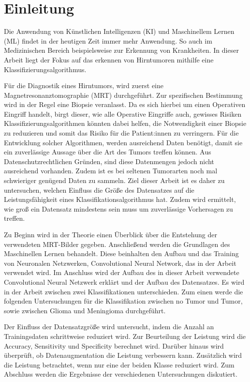 \chapter{Einleitung}

Die Anwendung von Künstlichen Intelligenzen (KI) und Maschinellem Lernen (ML) findet in der heutigen Zeit immer mehr Anwendung.
So auch im Medizinischen Bereich beispielsweise zur Erkennung von Krankheiten.
In dieser Arbeit liegt der Fokus auf das erkennen von Hirntumoren mithilfe eine Klassifizierungsalgorithmus.

Für die Diagnostik eines Hirntumors, wird zuerst eine Magnetresonanztomographie (MRT) durchgeführt.
Zur spezifischen Bestimmung wird in der Regel eine Biopsie veranlasst.
Da es sich hierbei um einen Operativen Eingriff handelt, birgt dieser, wie alle Operative Eingriffe auch, gewisses Risiken
Klassifizierungsalgorithmen könnten dabei helfen, die Notwendigkeit einer Biopsie zu reduzieren und somit das Risiko für die Patient:innen zu verringern.
Für die Entwicklung solcher Algorithmen, werden ausreichend Daten benötigt, damit sie ein zuverlässige Aussage über die Art des Tumors treffen können. 
Aus Datenschutzrechtlichen Gründen, sind diese Datenmengen jedoch nicht ausreichend vorhanden. 
Zudem ist es bei seltenen Tumorarten noch mal schwieriger genügend Daten zu sammeln.
Ziel dieser Arbeit ist es daher zu untersuchen, welchen Einfluss die Größe des Datensatzes auf die Leistungsfähigkeit eines Klassifikationsalgorithmus hat. 
Zudem wird ermittelt, wie groß ein Datensatz mindestens sein muss um zuverlässige Vorhersagen zu treffen.

Zu Beginn wird in der Theorie einen Überblick über die Entstehung der verwendeten MRT-Bilder gegeben. 
Anschließend werden die Grundlagen des Maschinellen Lernen behandelt.
Diese beinhalten den Aufbau und das Training von Neuronalen Netzwerken, Convolutional Neural Network, das in der Arbeit verwendet wird.
Im Anschluss wird der Aufbau des in dieser Arbeit verwendete Convolutional Neural Netzwerk erklärt und der Aufbau des Datensatzes. 
Es wird in der Arbeit zwischen zwei Klassifikationen unterschieden. 
Zum einen werde die folgenden Untersuchungen für die Klassifikation zwischen no Tumor und Tumor, sowie zwischen Glioma und Meningioma durchgeführt.

Der Einfluss der Datensatzgröße wird untersucht, indem die Anzahl an Trainingsdaten schrittweise reduziert wird.
Zur Beurteilung der Leistung wird die Accuracy, Sensitivity und Specificity berechnet wird. 
Darüber hinaus wird überprüft, ob Datenaugmentation die Leistung verbessern kann.
Zusätzlich wird die Leistung betrachtet, wenn nur eine der beiden Klasse reduziert wird. 
Zum Abschluss werden die Ergebnisse der verschiedenen Untersuchungen diskutiert.